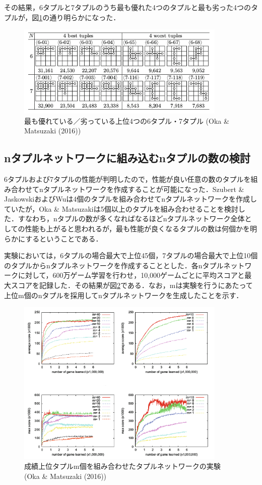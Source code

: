 \documentclass{suribt}
\begin{document}
その結果，6タプルと7タプルのうち最も優れた4つのタプルと最も劣った4つのタプルが，図\ref{figure_004}の通り明らかになった．

\begin{figure}[t]
	\begin{center}
	\includegraphics[width=10cm]{figure_004.png}
	\caption{最も優れている／劣っている上位4つの6タプル・7タプル (Oka \& Matsuzaki (2016))}
	\label{figure_004}
	\end{center}
\end{figure}

\subsection{nタプルネットワークに組み込むnタプルの数の検討}
6タプルおよび7タプルの性能が判明したので，性能が良い任意の数のタプルを組み合わせてnタプルネットワークを作成することが可能になった．Szubert \& JaskowskiおよびWuは4個のタプルを組み合わせてnタプルネットワークを作成していたが，Oka \& Matsuzakiは5個以上のタプルを組み合わせることを検討した．すなわち，nタプルの数が多くなればなるほどnタプルネットワーク全体としての性能も上がると思われるが，最も性能が良くなるタプルの数は何個かを明らかにするということである．

実験においては，6タプルの場合最大で上位45個，7タプルの場合最大で上位10個のタプルからnタプルネットワークを作成することとした．各nタプルネットワークに対して，600万ゲーム学習を行わせ，10,000ゲームごとに平均スコアと最大スコアを記録した．その結果が図\ref{figure_005}である．なお，mは実験を行うにあたって上位m個のnタプルを採用してnタプルネットワークを生成したことを示す．

\begin{figure}[t]
	\begin{center}
	\includegraphics[width=10cm]{figure_005.png}
	\caption{成績上位タプルm個を組み合わせたタプルネットワークの実験 (Oka \& Matsuzaki (2016))}
	\label{figure_005}
	\end{center}
\end{figure}
\end{document}
